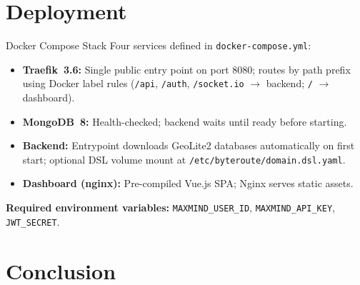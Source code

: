 \documentclass[aspectratio=169]{beamer}
\begin{document}
\section{Deployment}

\begin{frame}{Docker Compose Stack}
    Four services defined in \texttt{docker-compose.yml}:
    \vspace{0.3cm}
    \begin{itemize}
        \item \textbf{Traefik~3.6:} Single public entry point on port 8080; routes by path
              prefix using Docker label rules (\texttt{/api}, \texttt{/auth},
              \texttt{/socket.io} $\to$ backend; \texttt{/} $\to$ dashboard).
        \item \textbf{MongoDB~8:} Health-checked; backend waits until ready before starting.
        \item \textbf{Backend:} Entrypoint downloads GeoLite2 databases automatically on
              first start; optional DSL volume mount at \texttt{/etc/byteroute/domain.dsl.yaml}.
        \item \textbf{Dashboard (nginx):} Pre-compiled Vue.js SPA; Nginx serves static
              assets.
    \end{itemize}
    \vspace{0.3cm}
    \textbf{Required environment variables:}
    \texttt{MAXMIND\_USER\_ID}, \texttt{MAXMIND\_API\_KEY}, \texttt{JWT\_SECRET}.
\end{frame}

\section{Conclusion}
\end{document}
